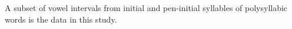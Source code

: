 A subset of vowel intervals from initial and pen-initial syllables of polysyllabic words is the data in this study. 



%
%
%
